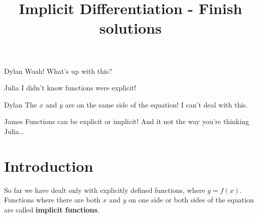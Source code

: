 \documentclass{ximera}
\title{Implicit Differentiation - Finish solutions}
\begin{document}
\maketitle
\begin{dialogue}
\item[Dylan] Woah! What's up with this?
\item[Julia] I didn't know functions were explicit!
\item[Dylan] The $x$ and $y$ are on the same side of the equation! I can't deal with this.
\item[James] Functions can be explicit or implicit! And it not the way you're thinking Julia...
\end{dialogue}
\section{Introduction}
So far we have dealt only with explicitly defined functions, where $y=f(x)$.  Functions where there are both $x$ and $y$ on one side or both sides of the equation are called \textbf{implicit functions}.
\end{document}
